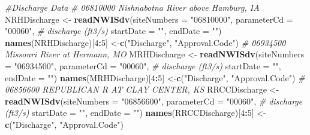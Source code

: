 \documentclass[12pt,]{article}
\newenvironment{Shaded}{\begin{snugshade}}{\end{snugshade}}
\newcommand{\CommentTok}[1]{\textcolor[rgb]{0.56,0.35,0.01}{\textit{#1}}}
\newcommand{\DataTypeTok}[1]{\textcolor[rgb]{0.13,0.29,0.53}{#1}}
\newcommand{\DecValTok}[1]{\textcolor[rgb]{0.00,0.00,0.81}{#1}}
\newcommand{\KeywordTok}[1]{\textcolor[rgb]{0.13,0.29,0.53}{\textbf{#1}}}
\newcommand{\NormalTok}[1]{#1}
\newcommand{\OperatorTok}[1]{\textcolor[rgb]{0.81,0.36,0.00}{\textbf{#1}}}
\newcommand{\StringTok}[1]{\textcolor[rgb]{0.31,0.60,0.02}{#1}}
\begin{document}
\begin{Shaded}
\begin{Highlighting}[]
\CommentTok{#Discharge Data}
\CommentTok{# 06810000 Nishnabotna River above Hamburg, IA }
\NormalTok{NRHDischarge <-}\StringTok{ }\KeywordTok{readNWISdv}\NormalTok{(}\DataTypeTok{siteNumbers =} \StringTok{"06810000"}\NormalTok{,}
                           \DataTypeTok{parameterCd =} \StringTok{"00060"}\NormalTok{, }\CommentTok{# discharge (ft3/s)}
                           \DataTypeTok{startDate =} \StringTok{""}\NormalTok{,}
                           \DataTypeTok{endDate =} \StringTok{""}\NormalTok{)}
\KeywordTok{names}\NormalTok{(NRHDischarge)[}\DecValTok{4}\OperatorTok{:}\DecValTok{5}\NormalTok{] <-}\KeywordTok{c}\NormalTok{(}\StringTok{"Discharge"}\NormalTok{, }\StringTok{"Approval.Code"}\NormalTok{)}
\CommentTok{# 06934500 Missouri River at Hermann, MO}
\NormalTok{MRHDischarge <-}\StringTok{ }\KeywordTok{readNWISdv}\NormalTok{(}\DataTypeTok{siteNumbers =} \StringTok{"06934500"}\NormalTok{,}
                             \DataTypeTok{parameterCd =} \StringTok{"00060"}\NormalTok{, }\CommentTok{# discharge (ft3/s)}
                             \DataTypeTok{startDate =} \StringTok{""}\NormalTok{,}
                             \DataTypeTok{endDate =} \StringTok{""}\NormalTok{)}
\KeywordTok{names}\NormalTok{(MRHDischarge)[}\DecValTok{4}\OperatorTok{:}\DecValTok{5}\NormalTok{] <-}\KeywordTok{c}\NormalTok{(}\StringTok{"Discharge"}\NormalTok{, }\StringTok{"Approval.Code"}\NormalTok{)}
\CommentTok{# 06856600 REPUBLICAN R AT CLAY CENTER, KS}
\NormalTok{RRCCDischarge <-}\StringTok{ }\KeywordTok{readNWISdv}\NormalTok{(}\DataTypeTok{siteNumbers =} \StringTok{"06856600"}\NormalTok{,}
                           \DataTypeTok{parameterCd =} \StringTok{"00060"}\NormalTok{, }\CommentTok{# discharge (ft3/s)}
                           \DataTypeTok{startDate =} \StringTok{""}\NormalTok{,}
                           \DataTypeTok{endDate =} \StringTok{""}\NormalTok{)}
\KeywordTok{names}\NormalTok{(RRCCDischarge)[}\DecValTok{4}\OperatorTok{:}\DecValTok{5}\NormalTok{] <-}\KeywordTok{c}\NormalTok{(}\StringTok{"Discharge"}\NormalTok{, }\StringTok{"Approval.Code"}\NormalTok{)}


\end{Highlighting}
\end{Shaded}
\end{document}
